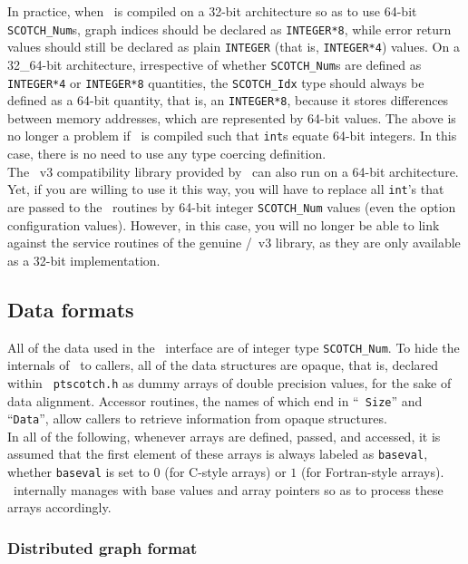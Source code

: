 In practice, when \scotch\ is compiled on a 32-bit architecture so as
to use 64-bit {\tt SCOTCH\_\lbt Num}s, graph indices should be
declared as {\tt INTEGER*8}, while error return values
should still be declared as plain {\tt INTEGER} (that is,
{\tt INTEGER*4}) values. On a 32\_64-bit architecture, irrespective of
whether {\tt SCOTCH\_\lbt Num}s are defined as {\tt INTEGER*4}
or {\tt INTEGER*8} quantities, the {\tt SCOTCH\_\lbt Idx} type
should always be defined as a 64-bit quantity, that is, an
{\tt INTEGER*8}, because it stores differences between memory
addresses, which are represented by 64-bit values.
The above is no longer a problem if \scotch\ is compiled such that
{\tt int}s equate 64-bit integers. In this case, there is no need to
use any type coercing definition.
\\

The \metis\ v3 compatibility library provided by \scotch\ can also
run on a 64-bit architecture. Yet, if you are willing to use it this
way, you will have to replace all {\tt int}'s that are passed to the
\metis\ routines by 64-bit integer {\tt SCOTCH\_\lbt Num} values (even
the option configuration values). However, in this case, you will no
longer be able to link against the service routines of the genuine
\metis/\parmetis\ v3 library, as they are only available as a 32-bit
implementation.

\subsection{Data formats}

All of the data used in the \libscotch\ interface are of integer type
{\tt SCOTCH\_Num}. To hide the internals of \ptscotch\ to callers, all
of the data structures are opaque, that is, declared within {\tt
ptscotch.h} as dummy arrays of double precision values, for the sake of
data alignment. Accessor routines, the names of which end in ``{\tt
Size}'' and ``{\tt Data}'', allow callers to retrieve information from
opaque structures.
\\

In all of the following, whenever arrays are defined, passed, and
accessed, it is assumed that the first element of these arrays is
always labeled as {\tt baseval}, whether {\tt baseval} is set to $0$
(for C-style arrays) or $1$ (for Fortran-style arrays). \ptscotch\
internally manages with base values and array pointers so as to
process these arrays accordingly.

\subsubsection{Distributed graph format}
\label{sec-lib-format-dgraph}

